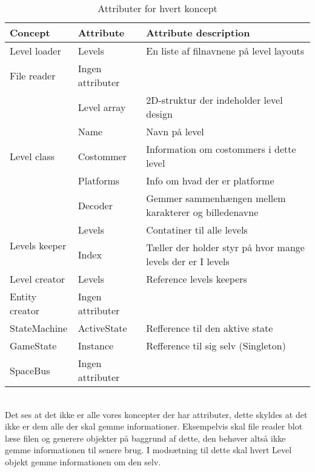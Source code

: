 \begin{table}[!h]
\centering
\begin{tabular}{|l|l|l|}
\hline
\textbf{Concept}               & \textbf{Attribute} & \textbf{Attribute description}                              \\ \hline
Level loader                   & Levels             & En liste af filnavnene på level layouts                     \\ \hline
File reader                    & Ingen attributer   &                                                             \\ \hline
\multirow{5}{*}{Level class}   & Level array        & 2D-struktur der indeholder level design                     \\ \cline{2-3}
                               & Name               & Navn på level                                               \\ \cline{2-3}
                               & Costommer          & Information om costommers i dette level                     \\ \cline{2-3}
                               & Platforms          & Info om hvad der er platforme                               \\ \cline{2-3}
                               & Decoder            & Gemmer sammenhængen mellem karakterer og billedenavne       \\ \hline
\multirow{2}{*}{Levels keeper} & Levels             & Contatiner til alle levels                                  \\ \cline{2-3}
                               & Index              & Tæller der holder styr på hvor mange levels der er I levels \\ \hline
Level creator                  & Levels             & Reference levels keepers                                    \\ \hline
Entity creator                 & Ingen attributer   &                                                             \\ \hline
StateMachine & ActiveState & Refference til den aktive state \\\hline
GameState & Instance & Refference til sig selv (Singleton)\\\hline
SpaceBus & Ingen attributer & \\\hline
\end{tabular}
\caption{Attributer for hvert koncept}
\label{attributes}
\end{table}\\
Det ses at det ikke er alle vores koncepter der har attributer, dette skyldes at det ikke er dem alle der skal gemme informationer. Eksempelvis skal file reader blot læse filen og generere objekter på baggrund af dette, den behøver altså ikke gemme informationen til senere brug. I modsætning til dette skal hvert Level objekt gemme informationen om den selv.\\
